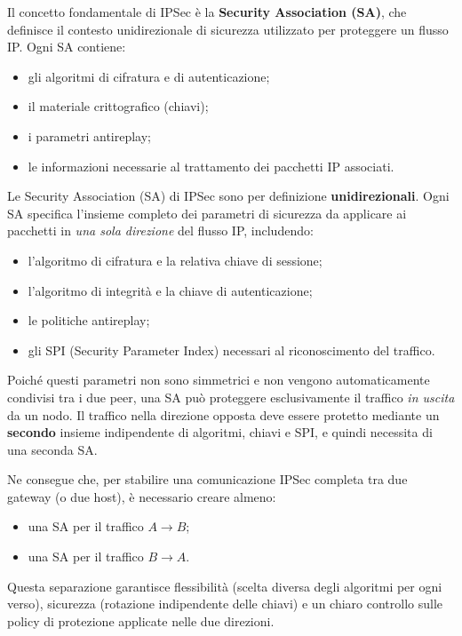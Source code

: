 Il concetto fondamentale di IPSec è la \textbf{Security Association (SA)}, che definisce il
contesto unidirezionale di sicurezza utilizzato per proteggere un flusso IP.
Ogni SA contiene:

\begin{itemize}
    \item gli algoritmi di cifratura e di autenticazione;
    \item il materiale crittografico (chiavi);
    \item i parametri antireplay;
    \item le informazioni necessarie al trattamento dei pacchetti IP associati.
\end{itemize}

Le Security Association (SA) di IPSec sono per definizione \textbf{unidirezionali}.
Ogni SA specifica l’insieme completo dei parametri di sicurezza da applicare ai
pacchetti in \emph{una sola direzione} del flusso IP, includendo:

\begin{itemize}
    \item l’algoritmo di cifratura e la relativa chiave di sessione;
    \item l’algoritmo di integrità e la chiave di autenticazione;
    \item le politiche antireplay;
    \item gli SPI (Security Parameter Index) necessari al riconoscimento del traffico.
\end{itemize}

Poiché questi parametri non sono simmetrici e non vengono automaticamente condivisi
tra i due peer, una SA può proteggere esclusivamente il traffico \emph{in uscita} da un nodo.
Il traffico nella direzione opposta deve essere protetto mediante un \textbf{secondo}
insieme indipendente di algoritmi, chiavi e SPI, e quindi necessita di una seconda SA.

Ne consegue che, per stabilire una comunicazione IPSec completa tra due gateway
(o due host), è necessario creare almeno:

\begin{itemize}
    \item una SA per il traffico $A \rightarrow B$;
    \item una SA per il traffico $B \rightarrow A$.
\end{itemize}

Questa separazione garantisce flessibilità (scelta diversa degli algoritmi per ogni verso),
sicurezza (rotazione indipendente delle chiavi) e un chiaro controllo sulle policy di
protezione applicate nelle due direzioni.


